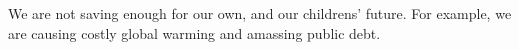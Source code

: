We are not saving enough for our own, and our childrens' future. For example, we are causing costly global warming and amassing public debt.
